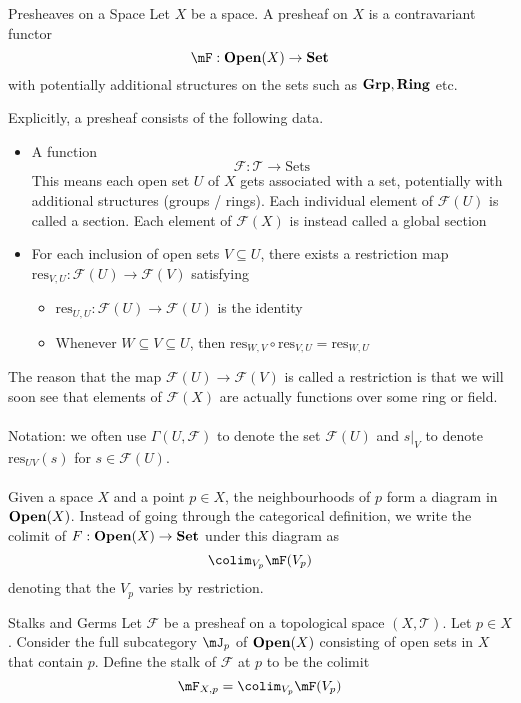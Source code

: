 \documentclass[a4paper]{article}
\begin{document}
\begin{defn}{Presheaves on a Space}{} Let $X$ be a space. A presheaf on $X$ is a contravariant functor $$\mF:\bold{Open}(X)\to\bold{Set}$$ with potentially additional structures on the sets such as $\bold{Grp},\bold{Ring}$ etc. 
\end{defn}

Explicitly, a presheaf consists of the following data. 

\begin{itemize}
\item A function $$\mathcal{F}:\mathcal{T}\to\text{Sets}$$ This means each open set $U$ of $X$ gets associated with a set, potentially with additional structures (groups / rings). Each individual element of $\mathcal{F}(U)$ is called a section. Each element of $\mathcal{F}(X)$ is instead called a global section
\item For each inclusion of open sets $V\subseteq U$, there exists a restriction map $\text{res}_{V,U}:\mathcal{F}(U)\to\mathcal{F}(V)$
 satisfying
\begin{itemize}
\item $\text{res}_{U,U}:\mathcal{F}(U)\to\mathcal{F}(U)$ is the identity
\item Whenever $W\subseteq V\subseteq U$, then $\text{res}_{W,V}\circ\text{res}_{V,U}=\text{res}_{W,U}$
\end{itemize}
\end{itemize}

The reason that the map $\mathcal{F}(U)\to\mathcal{F}(V)$ is called a restriction is that we will soon see that elements of $\mathcal{F}(X)$ are actually functions over some ring or field. \\~\\
Notation: we often use $\Gamma(U,\mathcal{F})$ to denote the set $\mathcal{F}(U)$ and $s|_V$ to denote $\text{res}_{UV}(s)$ for $s\in\mathcal{F}(U)$. \\~\\

Given a space $X$ and a point $p\in X$, the neighbourhoods of $p$ form a diagram in $\bold{Open}(X)$. Instead of going through the categorical definition, we write the colimit of $F:\bold{Open}(X)\to\bold{Set}$ under this diagram as $$\colim_{V_p}\mF(V_p)$$ denoting that the $V_p$ varies by restriction. 

\begin{defn}{Stalks and Germs}{} Let $\mathcal{F}$ be a presheaf on a topological space $(X,\mathcal{T})$. Let $p\in X$. Consider the full subcategory $\mJ_p$ of $\bold{Open}(X)$ consisting of open sets in $X$ that contain $p$. Define the stalk of $\mathcal{F}$ at $p$ to be the colimit $$\mF_{X,p}=\colim_{V_p}\mF(V_p)$$ 
\end{defn}
\end{document}
